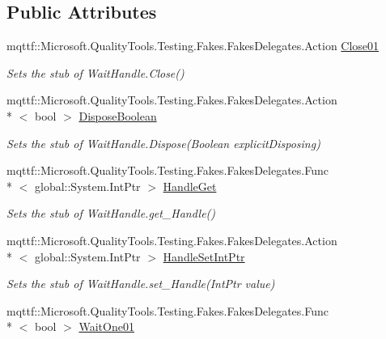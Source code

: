 \subsection*{Public Attributes}
\begin{DoxyCompactItemize}
\item 
mqttf\-::\-Microsoft.\-Quality\-Tools.\-Testing.\-Fakes.\-Fakes\-Delegates.\-Action \hyperlink{class_system_1_1_threading_1_1_fakes_1_1_stub_wait_handle_a18bcaa7d4f4caafa665e8c826b5d0888}{Close01}
\begin{DoxyCompactList}\small\item\em Sets the stub of Wait\-Handle.\-Close()\end{DoxyCompactList}\item 
mqttf\-::\-Microsoft.\-Quality\-Tools.\-Testing.\-Fakes.\-Fakes\-Delegates.\-Action\\*
$<$ bool $>$ \hyperlink{class_system_1_1_threading_1_1_fakes_1_1_stub_wait_handle_afaf6e39b7f29bdc5ab3cd87647a78438}{Dispose\-Boolean}
\begin{DoxyCompactList}\small\item\em Sets the stub of Wait\-Handle.\-Dispose(\-Boolean explicit\-Disposing)\end{DoxyCompactList}\item 
mqttf\-::\-Microsoft.\-Quality\-Tools.\-Testing.\-Fakes.\-Fakes\-Delegates.\-Func\\*
$<$ global\-::\-System.\-Int\-Ptr $>$ \hyperlink{class_system_1_1_threading_1_1_fakes_1_1_stub_wait_handle_aa751c5d97788b4613df9b3fa263da488}{Handle\-Get}
\begin{DoxyCompactList}\small\item\em Sets the stub of Wait\-Handle.\-get\-\_\-\-Handle()\end{DoxyCompactList}\item 
mqttf\-::\-Microsoft.\-Quality\-Tools.\-Testing.\-Fakes.\-Fakes\-Delegates.\-Action\\*
$<$ global\-::\-System.\-Int\-Ptr $>$ \hyperlink{class_system_1_1_threading_1_1_fakes_1_1_stub_wait_handle_a760dc8518ed42978a6835a2fb62a4bb0}{Handle\-Set\-Int\-Ptr}
\begin{DoxyCompactList}\small\item\em Sets the stub of Wait\-Handle.\-set\-\_\-\-Handle(\-Int\-Ptr value)\end{DoxyCompactList}\item 
mqttf\-::\-Microsoft.\-Quality\-Tools.\-Testing.\-Fakes.\-Fakes\-Delegates.\-Func\\*
$<$ bool $>$ \hyperlink{class_system_1_1_threading_1_1_fakes_1_1_stub_wait_handle_a5424aa528266dc74469e9e1ba117a41b}{Wait\-One01}

\end{DoxyCompactItemize}
